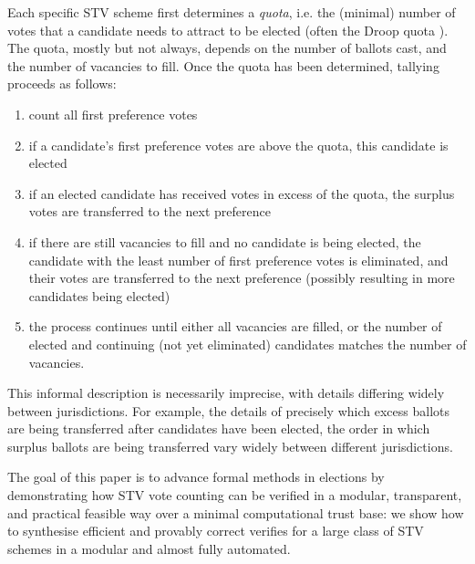 \documentclass[10pt,conference]{IEEEtran}
\begin{document}

Each specific STV scheme first determines a \emph{quota}, i.e. the (minimal) number of votes that a candidate needs to attract to be elected (often the Droop quota \cite{Droop:1881:MER}). The quota, mostly but not always, depends on the number of ballots cast, and the number of vacancies to fill. Once the quota has been determined, tallying proceeds as follows:
\begin{enumerate}
  \item count all first preference votes
  \item if a candidate's first preference votes are above the quota, this candidate is elected
  \item if an elected candidate has received votes in excess of the quota, the surplus votes are transferred to the next preference 
  \item if there are still vacancies to fill and no candidate is  being elected, the candidate with the least number of first preference votes is eliminated, and their votes are transferred to the next preference (possibly resulting in more candidates being elected)
  \item the process continues until either all vacancies are filled, or the number of elected and continuing (not yet eliminated) candidates matches the number of vacancies.
\end{enumerate}

This informal description is necessarily imprecise, with details differing widely between jurisdictions. For example,
the details of precisely which excess ballots are being transferred after candidates have been elected, the order in which surplus ballots are being transferred vary widely between different jurisdictions. 

The goal of this paper is to advance formal methods in elections by demonstrating how STV vote counting can be verified in a modular, transparent, and practical feasible way over a minimal computational trust base:  we show how to synthesise efficient and provably correct verifies for a large class of STV schemes in a modular and almost fully automated. 
\end{document}
